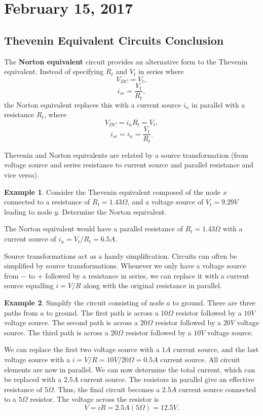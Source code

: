 \documentclass[11pt]{article}
\theoremstyle{plain} %
\theoremstyle{definition}
\theoremstyle{example}
\newtheorem*{example}{Example}
\theoremstyle{remark}
\begin{document}
\section{February 15, 2017}
\subsection{Thevenin Equivalent Circuits Conclusion}

The \textbf{Norton equivalent} circuit provides an alternative form to the Thevenin equivalent. Instead of specifying $R_t$ and $V_t$ in series where 
$$V_{DC} = V_t,$$
$$i_{sc} = \frac{V_t}{R_t},$$
the Norton equivalent replaces this with a current source $i_n$ in parallel with a resistance $R_t$, where
$$V_{DC} = i_nR_t = V_t,$$
$$i_{sc} = i_n = \frac{V_t}{R_t}.$$

Thevenin and Norton equivalents are related by a source transformation (from voltage source and series resistance to current source and parallel resistance and vice versa).

\begin{example}
Consider the Thevenin equivalent composed of the node $x$ connected to a resistance of $R_t = 1.43\Omega$, and a voltage source of $V_t = 9.29V$ leading to node $y$. Determine the Norton equivalent. 
\end{example}
The Norton equivalent would have a parallel resistance of $R_t = 1.43\Omega$ with a current source of $i_n = V_t/R_t = 6.5A$. 

Source transformations act as a handy simplification. Circuits can often be simplified by source transformations. Whenever we only have a voltage source from $-$ to $+$ followed by a resistance in series, we can replace it with a current source equalling $i = V/R$ along with the original resistance in parallel. 

\begin{example}
Simplify the circuit consisting of node $a$ to ground. There are three paths from $a$ to ground. The first path is across a $10\Omega$ resistor followed by a $10V$ voltage source. The second path is across a $20\Omega$ resistor followed by a $20V$ voltage source. The third path is across a $20\Omega$ resistor followed by a $10V$ voltage source. 
\end{example}

We can replace the first two voltage source with a $1A$ current source, and the last voltage source with a $i = V/R = 10V/20\Omega = 0.5A$ current source. All circuit elements are now in parallel. We can now determine the total current, which can be replaced with a $2.5A$ current source. The resistors in parallel give an effective resistance of $5\Omega$. Thus, the final circuit becomes a $2.5A$ current source connected to a $5\Omega$ resistor. The voltage across the resistor is 
$$V = iR = 2.5A(5\Omega) =  12.5V.$$
\end{document}
